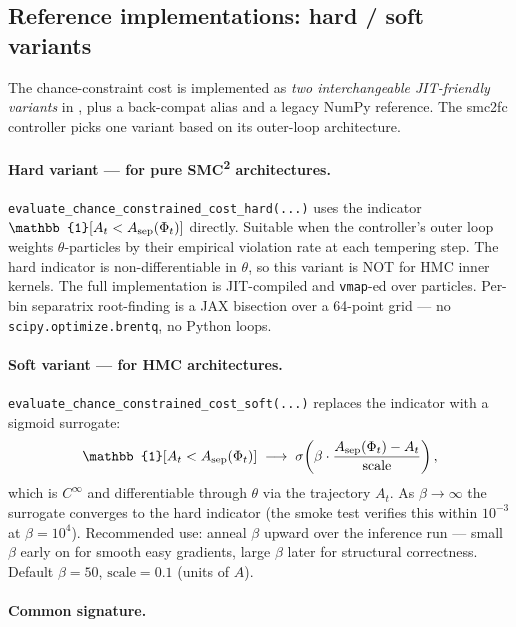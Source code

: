 \documentclass[11pt,a4paper]{article}
\theoremstyle{definition}
\begin{document}
\subsection{Reference implementations: hard / soft variants}

The chance-constraint cost is implemented as \emph{two interchangeable
JIT-friendly variants} in ,
plus a back-compat alias and a legacy NumPy reference. The smc2fc
controller picks one variant based on its outer-loop architecture.

\paragraph{Hard variant — for pure SMC\textsuperscript{2} architectures.}
\texttt{evaluate\_chance\_constrained\_cost\_hard(...)} uses the
indicator $\mathbb{1}[A_t < A_{\rm sep}(\Phi_t)]$ directly. Suitable
when the controller's outer loop weights $\theta$-particles by their
empirical violation rate at each tempering step. The hard indicator
is non-differentiable in $\theta$, so this variant is NOT for HMC inner
kernels. The full implementation is JIT-compiled and \texttt{vmap}-ed
over particles. Per-bin separatrix root-finding is a JAX bisection over
a 64-point grid — no \texttt{scipy.optimize.brentq}, no Python loops.

\paragraph{Soft variant — for HMC architectures.}
\texttt{evaluate\_chance\_constrained\_cost\_soft(...)} replaces the
indicator with a sigmoid surrogate:
\begin{equation}
\mathbb{1}[A_t < A_{\rm sep}(\Phi_t)] \;\longrightarrow\;
\sigma\!\left(\beta \cdot \frac{A_{\rm sep}(\Phi_t) - A_t}{\rm scale}\right),
\label{eq:soft-surrogate}
\end{equation}
which is $C^\infty$ and differentiable through $\theta$ via the trajectory
$A_t$. As $\beta \to \infty$ the surrogate converges to the hard
indicator (the smoke test verifies this within $10^{-3}$ at $\beta =
10^4$). Recommended use: anneal $\beta$ upward over the inference run
— small $\beta$ early on for smooth easy gradients, large $\beta$ later
for structural correctness. Default $\beta = 50$, $\text{scale} = 0.1$
(units of $A$).

\paragraph{Common signature.}
\end{document}
